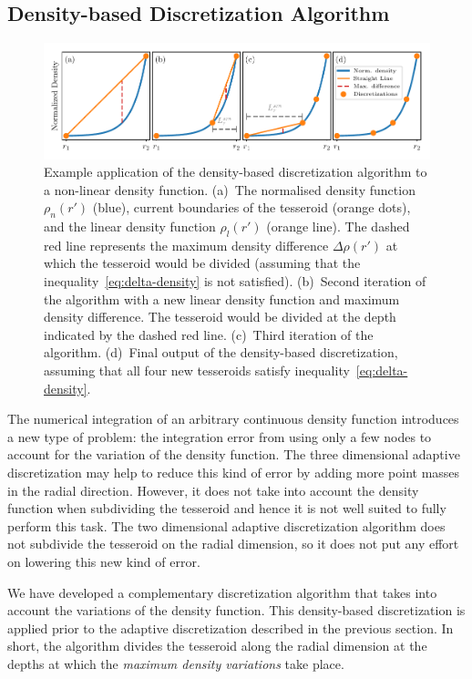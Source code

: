 \documentclass[extra, referee]{gji}
\begin{document}
\subsection{Density-based Discretization Algorithm}

\begin{figure}
\centering
\includegraphics[width=\linewidth]
    {figures/density-based-discretization-algorithm.pdf}
\caption{
    Example application of the density-based discretization algorithm to a non-linear
    density function.
    (a)~The normalised density function $\rho_n(r')$ (blue), current boundaries of the
    tesseroid (orange dots), and the linear density function $\rho_l(r')$ (orange line).
    The dashed red line represents the maximum density difference $\Delta \rho (r')$ at
    which the tesseroid would be divided (assuming that the
    inequality~\ref{eq:delta-density} is not satisfied).
    (b)~Second iteration of the algorithm with a new linear density function and maximum
    density difference. The tesseroid would be divided at the depth indicated by the
    dashed red line.
    (c)~Third iteration of the algorithm.
    (d)~Final output of the density-based discretization, assuming that all four new
    tesseroids satisfy inequality~\ref{eq:delta-density}.
}
\label{fig:density-discretization-algorithm}
\end{figure}

The numerical integration of an arbitrary continuous density function introduces a new
type of problem: the integration error from using only a few nodes to account for the
variation of the density function.
The three dimensional adaptive discretization may help
to reduce this kind of error by adding more point masses in the radial direction.
However, it does not take into account the density function when subdividing the
tesseroid and hence it is not well suited to fully perform this task.
The two dimensional adaptive discretization algorithm does not subdivide the tesseroid
on the radial dimension, so it does not put any effort on lowering this new kind of
error.

We have developed a complementary discretization
algorithm that takes into account the variations of the density function.
This density-based discretization is applied prior to the adaptive discretization
described in the previous section.
In short, the algorithm divides the tesseroid along the radial dimension at the
depths at which the \emph{maximum density variations} take place.
\end{document}
